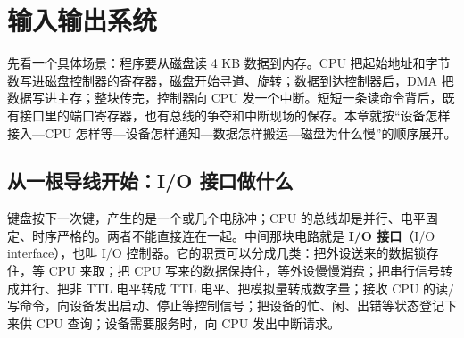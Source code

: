 \section{输入输出系统}

先看一个具体场景：程序要从磁盘读 4 KB 数据到内存。CPU 把起始地址和字节数写进磁盘控制器的寄存器，磁盘开始寻道、旋转；数据到达控制器后，DMA 把数据写进主存；整块传完，控制器向 CPU 发一个中断。短短一条读命令背后，既有接口里的端口寄存器，也有总线的争夺和中断现场的保存。本章就按“设备怎样接入—CPU 怎样等—设备怎样通知—数据怎样搬运—磁盘为什么慢”的顺序展开。

\subsection{从一根导线开始：I/O 接口做什么}

键盘按下一次键，产生的是一个或几个电脉冲；CPU 的总线却是并行、电平固定、时序严格的。两者不能直接连在一起。中间那块电路就是 \textbf{I/O 接口}（I/O interface），也叫 I/O 控制器。它的职责可以分成几类：把外设送来的数据锁存住，等 CPU 来取；把 CPU 写来的数据保持住，等外设慢慢消费；把串行信号转成并行、把非 TTL 电平转成 TTL 电平、把模拟量转成数字量；接收 CPU 的读/写命令，向设备发出启动、停止等控制信号；把设备的忙、闲、出错等状态登记下来供 CPU 查询；设备需要服务时，向 CPU 发出中断请求。


